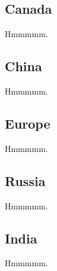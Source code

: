 \documentclass{article}
\begin{document}
\subsection{Canada}
Hmmmmm.
\subsection{China}
Hmmmmm.
\subsection{Europe}
Hmmmmm.
\subsection{Russia}
Hmmmmm.
\subsection{India}
Hmmmmm.
\end{document}
